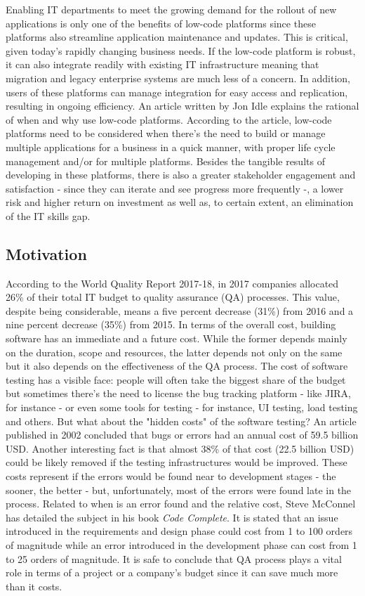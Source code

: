 \documentclass{sigchi}
\begin{document}
Enabling IT departments to meet the growing demand for the rollout of new applications is only one of the benefits of low-code platforms since these platforms also streamline application maintenance and updates. This is critical, given today’s rapidly changing business needs. If the low-code platform is robust, it can also integrate readily with existing IT infrastructure meaning that migration and legacy enterprise systems are much less of a concern. In addition, users of these platforms can manage integration for easy access and replication, resulting in ongoing efficiency. An article written by Jon Idle\cite{benefitsoflowcode} explains the rational of when and why use low-code platforms. According to the article, low-code platforms need to be considered when there's the need to build or manage multiple applications for a business in a quick manner, with proper life cycle management and/or for multiple platforms. Besides the tangible results of developing in these platforms, there is also a greater stakeholder engagement and satisfaction - since they can iterate and see progress more frequently -, a lower risk and higher return on investment as well as, to certain extent, an elimination of the IT skills gap.

\subsection{Motivation}
According to the World Quality Report 2017-18\cite{wqr1718}, in 2017 companies allocated 26\% of their total IT budget to quality assurance (QA) processes. This value, despite being considerable, means a five percent decrease (31\%) from 2016 and a nine percent decrease (35\%) from 2015. In terms of the overall cost, building software has an immediate and a future cost. While the former depends mainly on the duration, scope and resources, the latter depends not only on the same but it also depends on the effectiveness of the QA process.
The cost of software testing has a visible face: people will often take the biggest share of the budget but sometimes there's the need to license the bug tracking platform - like JIRA, for instance - or even some tools for testing - for instance, UI testing, load testing and others.
But what about the "hidden costs" of the software testing? An article published in 2002\cite{718084420020805} concluded that bugs or errors had an annual cost of 59.5 billion USD. Another interesting fact is that almost 38\% of that cost (22.5 billion USD) could be likely removed if the testing infrastructures would be improved. These costs represent if the errors would be found near to development stages - the sooner, the better - but, unfortunately, most of the errors were found late in the process.
Related to when is an error found and the relative cost, Steve McConnel has detailed the subject in his book \textit{Code Complete}\cite{McConnell:2004:CCS:1096143}. It is stated that an issue introduced in the requirements and design phase could cost from 1 to 100 orders of magnitude while an error introduced in the development phase can cost from 1 to 25 orders of magnitude. It is safe to conclude that QA process plays a vital role in terms of a project or a company's budget since it can save much more than it costs.
\end{document}
